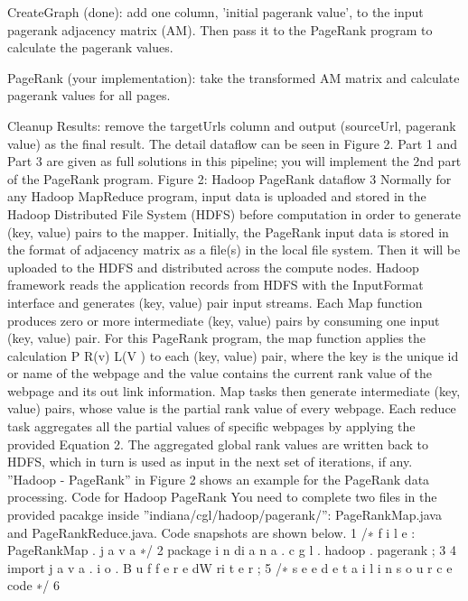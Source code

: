 \item CreateGraph (done): add one column, ’initial pagerank value’, to the input pagerank adjacency matrix
(AM). Then pass it to the PageRank program to calculate the pagerank values.
\item PageRank (your implementation): take the transformed AM matrix and calculate pagerank values for
all pages.
\item Cleanup Results: remove the targetUrls column and output (sourceUrl, pagerank value) as the
final result.
The detail dataflow can be seen in Figure 2. Part 1 and Part 3 are given as full solutions in this pipeline;
you will implement the 2nd part of the PageRank program.
Figure 2: Hadoop PageRank dataflow
3
Normally for any Hadoop MapReduce program, input data is uploaded and stored in the Hadoop Distributed
File System (HDFS) before computation in order to generate (key, value) pairs to the mapper.
Initially, the PageRank input data is stored in the format of adjacency matrix as a file(s) in the local file
system. Then it will be uploaded to the HDFS and distributed across the compute nodes. Hadoop framework
reads the application records from HDFS with the InputFormat interface and generates (key, value) pair
input streams. Each Map function produces zero or more intermediate (key, value) pairs by consuming
one input (key, value) pair. For this PageRank program, the map function applies the calculation P R(v)
L(V )
to
each (key, value) pair, where the key is the unique id or name of the webpage and the value contains the
current rank value of the webpage and its out link information. Map tasks then generate intermediate (key,
value) pairs, whose value is the partial rank value of every webpage. Each reduce task aggregates all the
partial values of specific webpages by applying the provided Equation 2. The aggregated global rank values
are written back to HDFS, which in turn is used as input in the next set of iterations, if any. ”Hadoop -
PageRank” in Figure 2 shows an example for the PageRank data processing.
Code for Hadoop PageRank
You need to complete two files in the provided pacakge inside ”indiana/cgl/hadoop/pagerank/”: PageRankMap.java
and PageRankReduce.java. Code snapshots are shown below.
1 /∗ f i l e : PageRankMap . j a v a ∗/
2 package i n di a n a . c g l . hadoop . pagerank ;
3
4 import j a v a . i o . B u f f e r e dW ri t e r ;
5 /∗ s e e d e t a i l i n s o u r c e code ∗/
6
